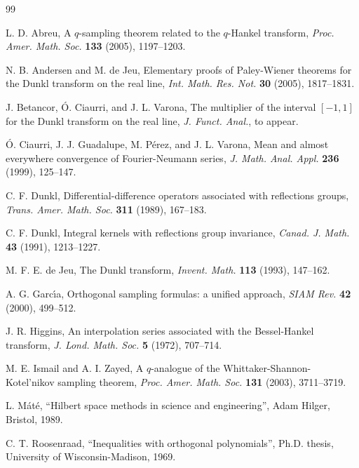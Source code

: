 \documentclass[11pt]{amsart}
\theoremstyle{plain}
\begin{document}
\begin{thebibliography}{99}

 L. D. Abreu,
{A $q$-sampling theorem related to the $q$-Hankel transform,}
\textit{Proc. Amer. Math. Soc.}
\textbf{133} (2005), 1197--1203.

 N. B. Andersen and M. de Jeu,
{Elementary proofs of Paley-Wiener theorems 
for the Dunkl transform on the real line,}
\textit{Int. Math. Res. Not.}
\textbf{30} (2005), 1817--1831.

 J. Betancor, \'O. Ciaurri, and J. L. Varona,
{The multiplier of the interval $[-1,1]$ for the Dunkl transform on the real line,}
\textit{J. Funct. Anal.}, to appear.

 \'O. Ciaurri, J. J. Guadalupe, M. P\'erez, and J. L. Varona,  
{Mean and almost everywhere convergence of Fourier-Neumann series,} 
\textit{J. Math. Anal. Appl.} 
\textbf{236} (1999), 125--147. 

 C. F. Dunkl,
{Differential-difference operators associated with reflections groups,}
\textit{Trans. Amer. Math. Soc.}
\textbf{311} (1989), 167--183.

 C. F. Dunkl,
{Integral kernels with reflections group invariance,}
\textit{Canad. J. Math.}
\textbf{43} (1991), 1213--1227.

 M. F. E. de Jeu,
{The Dunkl transform,}
\textit{Invent. Math.}
\textbf{113} (1993), 147--162.

 A. G. Garc\'{\i}a,
{Orthogonal sampling formulas: a unified approach,}
\textit{SIAM Rev.}
\textbf{42} (2000), 499--512.

 J. R. Higgins, 
{An interpolation series associated with the Bessel-Hankel transform}, 
\textit{J. Lond. Math. Soc.} \textbf{5} (1972), 707--714.

 M. E. Ismail and A. I. Zayed,
{A $q$-analogue of the Whittaker-Shannon-Kotel'nikov sampling theorem,}
\textit{Proc. Amer. Math. Soc.}
\textbf{131} (2003), 3711--3719.

 L. M\'{a}t\'{e}, 
{``Hilbert space methods in science and engineering'',} 
Adam Hilger, Bristol, 1989.

 C. T. Roosenraad, 
{``Inequalities with orthogonal polynomials'',} 
Ph.D. thesis,
University of Wisconsin-Madison, 1969.


\end{thebibliography}
\end{document}
